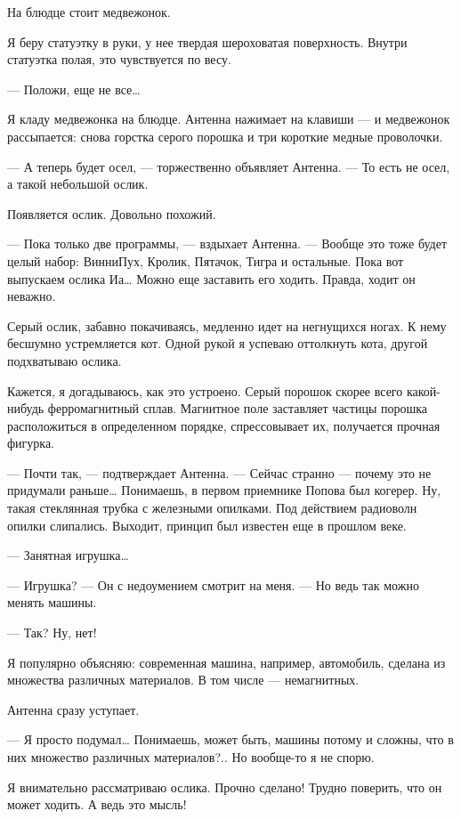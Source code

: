 На блюдце стоит медвежонок.

Я беру статуэтку  в руки,  у нее твердая  шероховатая поверхность.  Внутри
статуэтка полая, это чувствуется по весу.

— Положи, еще не все…

Я кладу медвежонка на блюдце. Антенна  нажимает на клавиши — и  медвежонок
рассыпается:  снова  горстка   серого  порошка  и   три  короткие   медные
проволочки.

— А теперь  будет осел,  — торжественно объявляет  Антенна. —  То есть  не
осел, а такой небольшой ослик.

Появляется ослик. Довольно похожий.

— Пока только две программы, —  вздыхает Антенна. — Вообще это тоже  будет
целый набор:  ВинниПух,  Кролик,  Пятачок, Тигра  и  остальные.  Пока  вот
выпускаем ослика  Иа… Можно  еще заставить  его ходить.  Правда, ходит  он
неважно.

Серый ослик, забавно  покачиваясь, медленно  идет на  негнущихся ногах.  К
нему бесшумно устремляется  кот. Одной  рукой я  успеваю оттолкнуть  кота,
другой подхватываю ослика.

Кажется, я  догадываюсь,  как это  устроено.  Серый порошок  скорее  всего
какой-нибудь  ферромагнитный  сплав.  Магнитное  поле  заставляет  частицы
порошка расположиться в определенном порядке, спрессовывает их, получается
прочная фигурка.

— Почти так,  — подтверждает  Антенна. — Сейчас  странно —  почему это  не
придумали раньше… Понимаешь,  в первом приемнике  Попова был когерер.  Ну,
такая стеклянная  трубка с  железными  опилками. Под  действием  радиоволн
опилки слипались. Выходит, принцип был известен еще в прошлом веке.

— Занятная игрушка…

— Игрушка? — Он с недоумением смотрит на меня. — Но ведь так можно  менять
машины.

— Так? Ну, нет!

Я популярно объясняю: современная машина, например, автомобиль, сделана из
множества различных материалов. В том числе — немагнитных.

Антенна сразу уступает.

— Я просто подумал… Понимаешь, может  быть, машины потому и сложны, что  в
них множество различных материалов?.. Но вообще-то я не спорю.

Я внимательно рассматриваю ослика. Прочно сделано! Трудно поверить, что он
может ходить. А ведь это мысль!

